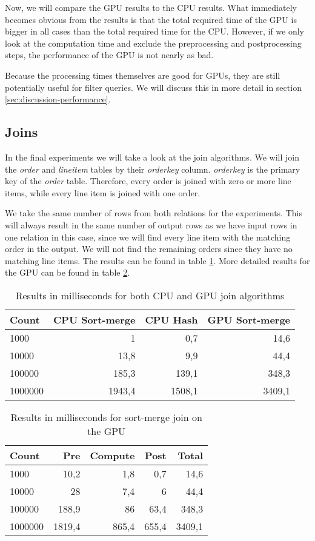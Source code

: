 \documentclass[a4paper,titlepage]{article}
\begin{document}
Now, we will compare the GPU results to the CPU results. What immediately becomes obvious from the results is that the total required time of the GPU is bigger in all cases than the total required time for the CPU. However, if we only look at the computation time and exclude the preprocessing and postprocessing steps, the performance of the GPU is not nearly as bad.

Because the processing times themselves are good for GPUs, they are still potentially useful for filter queries. We will discuss this in more detail in section \ref{sec:discussion-performance}.

\subsection{Joins}
In the final experiments we will take a look at the join algorithms. We will join the \emph{order} and \emph{lineitem} tables by their \emph{orderkey} column. \emph{orderkey} is the primary key of the \emph{order} table. Therefore, every order is joined with zero or more line items, while every line item is joined with one order.

We take the same number of rows from both relations for the experiments. This will always result in the same number of output rows as we have input rows in one relation in this case, since we will find every line item with the matching order in the output. We will not find the remaining orders since they have no matching line items. The results can be found in table \ref{tbl:join-results}. More detailed results for the GPU can be found in table \ref{tbl:join-gpu}.

\begin{table}
\begin{tabular}{l r r r}
\toprule
\textbf{Count} & \textbf{CPU Sort-merge} & \textbf{CPU Hash} & \textbf{GPU Sort-merge} \\
\midrule
1000    & 1      & 0,7    & 14,6 \\
10000   & 13,8   & 9,9    & 44,4 \\
100000  & 185,3  & 139,1  & 348,3 \\
1000000 & 1943,4 & 1508,1 & 3409,1 \\
\bottomrule
\end{tabular}
\caption{Results in milliseconds for both CPU and GPU join algorithms}
\label{tbl:join-results}
\end{table}

\begin{table}
\begin{tabular}{l r r r r}
\toprule
\textbf{Count} & \textbf{Pre} & \textbf{Compute} & \textbf{Post} & \textbf{Total}\\
\midrule
1000    & 10,2   & 1,8   & 0,7   & 14,6 \\
10000   & 28     & 7,4   & 6     & 44,4 \\
100000  & 188,9  & 86    & 63,4  & 348,3 \\
1000000 & 1819,4 & 865,4 & 655,4 & 3409,1 \\
\bottomrule
\end{tabular}
\caption{Results in milliseconds for sort-merge join on the GPU}
\label{tbl:join-gpu}
\end{table}
\end{document}
